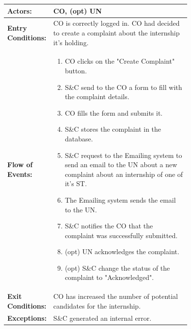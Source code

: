 \begin{center}
    \begin{longtable}{|l|p{0.75\linewidth}|}
        \hline
        \textbf{Actors:}           & CO, (opt) UN                                                                                                                     \\
        \hline
        \textbf{Entry Conditions:} & CO is correctly logged in. CO had decided to create a complaint about the internship it's holding.                               \\
        \hline
        \textbf{Flow of Events:}   & \begin{enumerate}
                                         \item CO clicks on the "Create Complaint" button.
                                         \item S\&C send to the CO a form to fill with the complaint details.
                                         \item CO fills the form and submits it.
                                         \item S\&C stores the complaint in the database.
                                         \item S\&C request to the Emailing system to send an email to the UN about a new complaint about an internship of one of it's ST.
                                         \item The Emailing system sends the email to the UN.
                                         \item S\&C notifies the CO that the complaint was successfully submitted.
                                         \item (opt) UN acknowledges the complaint.
                                         \item (opt) S\&C change the status of the complaint to "Acknowledged".
                                     \end{enumerate} \\
        \hline
        \textbf{Exit Conditions:}  & CO has increased the number of potential candidates for the internship.                                                          \\
        \hline
        \textbf{Exceptions:}       & S\&C generated an internal error.                                                                                                \\
        \hline
    \end{longtable}
\end{center}

